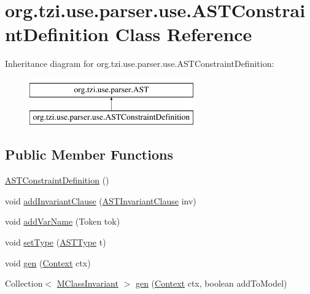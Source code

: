 \hypertarget{classorg_1_1tzi_1_1use_1_1parser_1_1use_1_1_a_s_t_constraint_definition}{\section{org.\-tzi.\-use.\-parser.\-use.\-A\-S\-T\-Constraint\-Definition Class Reference}
\label{classorg_1_1tzi_1_1use_1_1parser_1_1use_1_1_a_s_t_constraint_definition}
}
Inheritance diagram for org.\-tzi.\-use.\-parser.\-use.\-A\-S\-T\-Constraint\-Definition\-:\begin{figure}[H]
\begin{center}
\leavevmode
\includegraphics[height=2.000000cm]{classorg_1_1tzi_1_1use_1_1parser_1_1use_1_1_a_s_t_constraint_definition}
\end{center}
\end{figure}
\subsection*{Public Member Functions}
\begin{DoxyCompactItemize}
\item 
\hyperlink{classorg_1_1tzi_1_1use_1_1parser_1_1use_1_1_a_s_t_constraint_definition_af633adf0b088ad5cf559a31662873b5e}{A\-S\-T\-Constraint\-Definition} ()
\item 
void \hyperlink{classorg_1_1tzi_1_1use_1_1parser_1_1use_1_1_a_s_t_constraint_definition_ac523be3396736cf6509644245b1a6136}{add\-Invariant\-Clause} (\hyperlink{classorg_1_1tzi_1_1use_1_1parser_1_1use_1_1_a_s_t_invariant_clause}{A\-S\-T\-Invariant\-Clause} inv)
\item 
void \hyperlink{classorg_1_1tzi_1_1use_1_1parser_1_1use_1_1_a_s_t_constraint_definition_a34df8c6a1cba2a6ac65f80efa09c913b}{add\-Var\-Name} (Token tok)
\item 
void \hyperlink{classorg_1_1tzi_1_1use_1_1parser_1_1use_1_1_a_s_t_constraint_definition_a9213eed793b5f1a5d9a0cbfc1bda68fd}{set\-Type} (\hyperlink{classorg_1_1tzi_1_1use_1_1parser_1_1ocl_1_1_a_s_t_type}{A\-S\-T\-Type} t)
\item 
void \hyperlink{classorg_1_1tzi_1_1use_1_1parser_1_1use_1_1_a_s_t_constraint_definition_a9fb9dc33a4843cc32cd5d5a56283d25b}{gen} (\hyperlink{classorg_1_1tzi_1_1use_1_1parser_1_1_context}{Context} ctx)
\item 
Collection$<$ \hyperlink{classorg_1_1tzi_1_1use_1_1uml_1_1mm_1_1_m_class_invariant}{M\-Class\-Invariant} $>$ \hyperlink{classorg_1_1tzi_1_1use_1_1parser_1_1use_1_1_a_s_t_constraint_definition_a652db0d0f091f31badd190c35cf67e95}{gen} (\hyperlink{classorg_1_1tzi_1_1use_1_1parser_1_1_context}{Context} ctx, boolean add\-To\-Model)
\end{DoxyCompactItemize}


